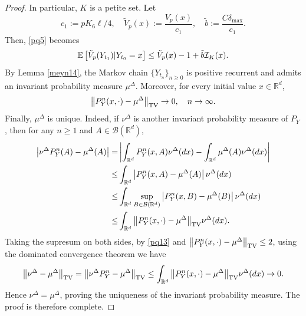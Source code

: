 \documentclass[preprint,12pt,compress]{elsarticle}
\begin{document}
\begin{proof}
In particular, $K$ is a petite set.
Let 
\begin{equation*}
	c_1 := {pK_6\ell}/{4}, \quad {{\tilde V}_p}(x) := \frac{{{V_p}(x)}}{c_1 }, \quad \tilde b := \frac{{C{\delta _{\max }}}}{c_1 }.
\end{equation*}
Then, \eqref{pq5} becomes
\begin{equation*}
	\mathbb{E}\left[ {{{\tilde V}_p}({Y_{{t_{ 1}}}})|{Y_{{t_0}}} = x} \right] \le {{\tilde V}_p}(x) - 1 + \tilde b{{\cal I}_K}(x) .
\end{equation*}
By Lemma \ref{meyn14}, the Markov chain ${\{ {Y_{{t_n}}}\} _{n \ge 0}}$ is positive recurrent and admits an invariant probability measure $\mu^\Delta$. Moreover, for every initial value $x \in \mathbb{R}^d$,
\begin{equation}  \label{pq13}
	{\left\| {{P_Y^n}(x, \cdot ) - {\mu ^\Delta }} \right\|_{{\rm TV}}} \to 0, \quad n \to \infty.
\end{equation}
Finally, $\mu^\Delta$ is unique. Indeed, if $\nu^{\Delta}$ is another invariant probability measure of $P_Y$, then for any $n \ge 1$ and $A \in \mathcal{B}(\mathbb{R}^d)$,
\begin{equation*}
\begin{split}
	\left| {\nu^{\Delta} P_Y^n(A) - {\mu ^\Delta }(A)} \right| =& \left| {\int_{{\mathbb{R}^d}} {P_Y^n(x,A)\nu^{\Delta} (dx)}  - \int_{{\mathbb{R}^d}} {{\mu ^\Delta }(A)\nu^{\Delta} (dx)} } \right| \\
	\le& \int_{{\mathbb{R}^d}} {\left| {P_Y^n(x,A) - {\mu ^\Delta }(A)} \right|\nu^{\Delta} (dx)} \\
	\le& \int_{{\mathbb{R}^d}} {\mathop {\sup }\limits_{B \in \mathcal{B}({\mathbb{R}^d})} \left| {P_Y^n(x,B) - {\mu ^\Delta }(B)} \right|\nu^{\Delta} (dx)} \\
	\le& \int_{{\mathbb{R}^d}} {{{\left\| {P_Y^n(x, \cdot ) - {\mu ^\Delta }} \right\|}_{{\rm TV}}}\nu^{\Delta} (dx)} .
\end{split}
\end{equation*}
Taking the supresum on both sides, by \eqref{pq13} and ${{{\left\| {P_Y^n(x, \cdot ) - {\mu ^\Delta }} \right\|}_{{\rm TV}}}} \le 2$, using the dominated convergence theorem we have
\begin{equation*}
\begin{split}
	{\left\| {\nu^{\Delta}  - {\mu ^\Delta }} \right\|_{{\rm TV}}} = {\left\| {\nu^{\Delta} P_Y^n - {\mu ^\Delta }} \right\|_{{\rm TV}}} \le \int_{{\mathbb{R}^d}} {{{\left\| {P_Y^n(x, \cdot ) - {\mu ^\Delta }} \right\|}_{{\rm TV}}}\nu^{\Delta} (dx)}  \to 0.
\end{split}
\end{equation*}
Hence $\nu^{\Delta}=\mu^\Delta$, proving the uniqueness of the invariant probability measure.
The proof is therefore complete.
\end{proof}
\end{document}
